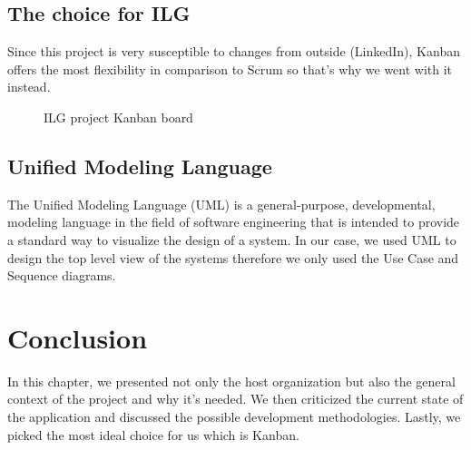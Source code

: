 \subsection{The choice for ILG}
Since this project is very susceptible to changes from outside (LinkedIn), Kanban offers the most flexibility in comparison to Scrum so that’s why we went with it instead.

\begin{figure}[H]
    \centering
    \caption{ILG project Kanban board}
    \label{fig:ilg-project-kanban-board}
\end{figure}

\subsection{Unified Modeling Language}
The Unified Modeling Language (UML) is a general-purpose, developmental, modeling language in the field of software engineering that is intended to provide a standard way to visualize the design of a system. In our case, we used UML to design the top level view of the systems therefore we only used the Use Case and Sequence diagrams.

\setcounter{secnumdepth}{0} %
\section{Conclusion}
In this chapter, we presented not only the host organization but also the general context of the project and why it's needed.
We then criticized the current state of the  application and discussed the possible development methodologies.
Lastly, we picked the most ideal choice for us which is Kanban.
